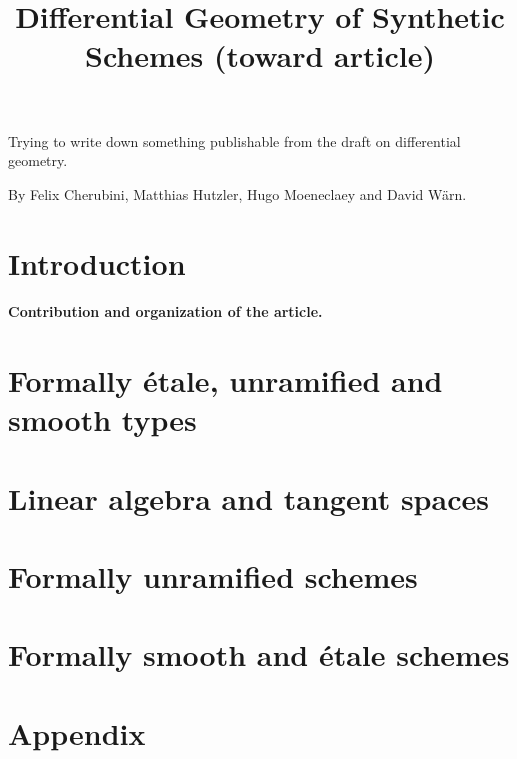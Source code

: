 \documentclass{../util/zariski}
\title{Differential Geometry of Synthetic Schemes (toward article)}
\begin{document}
\maketitle

Trying to write down something publishable from the draft on differential geometry.

By Felix Cherubini, Matthias Hutzler, Hugo Moeneclaey and David Wärn.







\tableofcontents

\section*{Introduction}

\paragraph{Contribution and organization of the article. }


\section{Formally étale, unramified and smooth types}


\section{Linear algebra and tangent spaces}


\section{Formally unramified schemes}


\section{Formally smooth and étale schemes}


\pagebreak
\appendix
\section*{Appendix}


\printindex

\printbibliography
\end{document}

